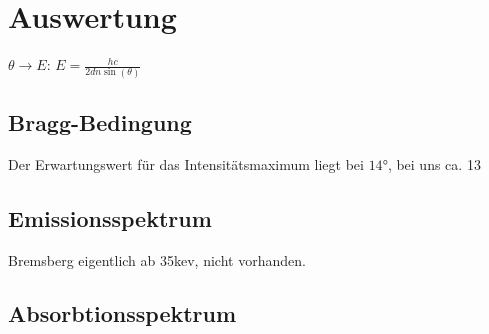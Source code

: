 \section{Auswertung}
\label{sec:Auswertung}
$\theta \rightarrow E$: $E = \frac{hc}{2dn\sin(\theta)}$

\subsection{Bragg-Bedingung}
\label{sec:bragg}

Der Erwartungswert für das Intensitätsmaximum liegt bei $14\si{\degree}$, bei uns ca. 13

\subsection{Emissionsspektrum}
\label{sec:emission}
Bremsberg eigentlich ab 35kev, nicht vorhanden.

\subsection{Absorbtionsspektrum}
\label{sec:absorption}
